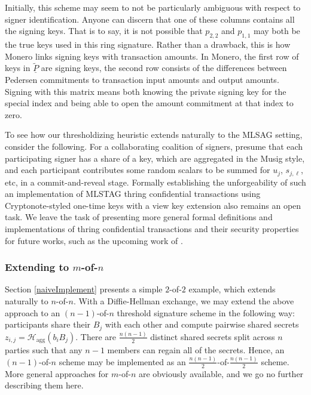 \documentclass{iacrtrans}
\theoremstyle{definition}
\numberwithin{theorem}{subsection}
\numberwithin{lemma}{theorem}
\begin{document}
Initially, this scheme may seem to not be particularly ambiguous with respect to signer identification. Anyone can discern that one of these columns contains all the signing keys. That is to say, it is not possible that $p_{2,2}$ and $p_{1,1}$ may both be the true keys used in this ring signature. Rather than a drawback, this is how Monero links signing keys with transaction amounts. In Monero, the first row of keys in $\widetilde{\underline{P}}$ are signing keys, the second row consists of the differences between Pedersen commitments to transaction input amounts and output amounts. Signing with this matrix means both knowing the private signing key for the special index and being able to open the amount commitment at that index to zero.

To see how our thresholdizing heuristic extends naturally to the MLSAG setting, consider the following. For a collaborating coalition of signers, presume that each participating signer has a share of a key, which are aggregated in the Musig style, and each participant contributes some random scalars to be summed for $u_j$, $s_{j,\ell}$, etc, in a commit-and-reveal stage. Formally establishing the unforgeability of such an implementation of MLSTAG thring confidential transactions using Cryptonote-styled one-time keys with a view key extension also remains an open task. We leave the task of presenting more general formal definitions and implementations of thring confidential transactions and their security properties for future works, such as the upcoming work of \cite{ruffct2}.














\subsubsection{Extending to $m$-of-$n$}

Section \ref{naiveImplement} presents a simple $2$-of-$2$ example, which extends naturally to $n$-of-$n$. With a Diffie-Hellman exchange, we may extend the above approach to an $(n-1)$-of-$n$ threshold signature scheme in the following way: participants share their $B_j$ with each other and compute pairwise shared secrets $z_{i,j} = \mathcal{H}_{\text{agg}}(b_i B_j)$. There are $\frac{n(n-1)}{2}$ distinct shared secrets split across $n$ parties such that any $n-1$ members can regain all of the secrets.  Hence, an $(n-1)$-of-$n$ scheme may be implemented as an $\frac{n(n-1)}{2}$-of-$\frac{n(n-1)}{2}$ scheme. More general approaches for $m$-of-$n$ are obviously available, and we go no further describing them here.
\end{document}
